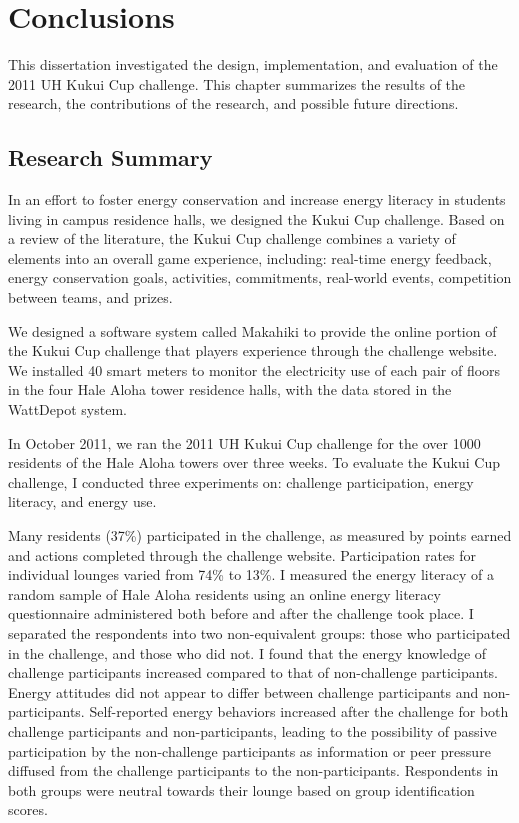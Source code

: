 \chapter{Conclusions}
\label{cha:conclusions}

This dissertation investigated the design, implementation, and evaluation of the 2011 UH Kukui Cup challenge. This chapter summarizes the results of the research, the contributions of the research, and possible future directions.


\section{Research Summary}

In an effort to foster energy conservation and increase energy literacy in students living in campus residence halls, we designed the Kukui Cup challenge. Based on a review of the literature, the Kukui Cup challenge combines a variety of elements into an overall game experience, including: real-time energy feedback, energy conservation goals, activities, commitments, real-world events, competition between teams, and prizes.

We designed a software system called Makahiki to provide the online portion of the Kukui Cup challenge that players experience through the challenge website. We installed 40 smart meters to monitor the electricity use of each pair of floors in the four Hale Aloha tower residence halls, with the data stored in the WattDepot system.

In October 2011, we ran the 2011 UH Kukui Cup challenge for the over 1000 residents of the Hale Aloha towers over three weeks. To evaluate the Kukui Cup challenge, I conducted three experiments on: challenge participation, energy literacy, and energy use.

Many residents (37\%) participated in the challenge, as measured by points earned and actions completed through the challenge website. Participation rates for individual lounges varied from 74\% to 13\%. I measured the energy literacy of a random sample of Hale Aloha residents using an online energy literacy questionnaire administered both before and after the challenge took place. I separated the respondents into two non-equivalent groups: those who participated in the challenge, and those who did not. I found that the energy knowledge of challenge participants increased compared to that of non-challenge participants. Energy attitudes did not appear to differ between challenge participants and non-participants. Self-reported energy behaviors increased after the challenge for both challenge participants and non-participants, leading to the possibility of passive participation by the non-challenge participants as information or peer pressure diffused from the challenge participants to the non-participants. Respondents in both groups were neutral towards their lounge based on group identification scores.

